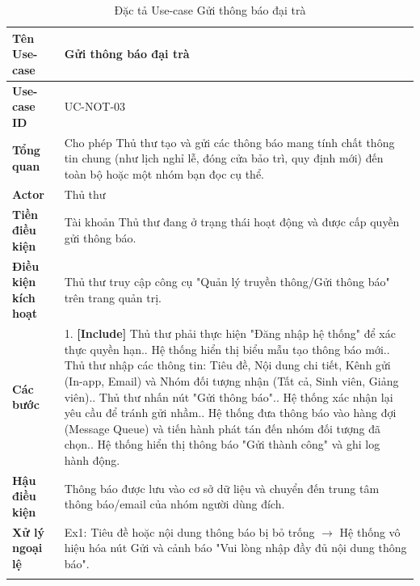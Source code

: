 \begin{longtable}{|p{3.5cm}|p{11.5cm}|}
    \hline
    \textbf{Tên Use-case} & \textbf{Gửi thông báo đại trà} \\
    \hline
    \textbf{Use-case ID} & UC-NOT-03 \\
    \hline
    \textbf{Tổng quan} & Cho phép Thủ thư tạo và gửi các thông báo mang tính chất thông tin chung (như lịch nghỉ lễ, đóng cửa bảo trì, quy định mới) đến toàn bộ hoặc một nhóm bạn đọc cụ thể. \\
    \hline
    \textbf{Actor} & Thủ thư \\
    \hline
    \textbf{Tiền điều kiện} & Tài khoản Thủ thư đang ở trạng thái hoạt động và được cấp quyền gửi thông báo. \\
    \hline
    \textbf{Điều kiện kích hoạt} & Thủ thư truy cập công cụ "Quản lý truyền thông/Gửi thông báo" trên trang quản trị. \\
    \hline
    \textbf{Các bước} & 
    1. \textbf{[Include]} Thủ thư phải thực hiện "Đăng nhập hệ thống" để xác thực quyền hạn.\newline
    2. Hệ thống hiển thị biểu mẫu tạo thông báo mới.\newline
    3. Thủ thư nhập các thông tin: Tiêu đề, Nội dung chi tiết, Kênh gửi (In-app, Email) và Nhóm đối tượng nhận (Tất cả, Sinh viên, Giảng viên).\newline
    4. Thủ thư nhấn nút "Gửi thông báo".\newline
    5. Hệ thống xác nhận lại yêu cầu để tránh gửi nhầm.\newline
    6. Hệ thống đưa thông báo vào hàng đợi (Message Queue) và tiến hành phát tán đến nhóm đối tượng đã chọn.\newline
    7. Hệ thống hiển thị thông báo "Gửi thành công" và ghi log hành động. \\
    \hline
    \textbf{Hậu điều kiện} & Thông báo được lưu vào cơ sở dữ liệu và chuyển đến trung tâm thông báo/email của nhóm người dùng đích. \\
    \hline
    \textbf{Xử lý ngoại lệ} & 
    Ex1: Tiêu đề hoặc nội dung thông báo bị bỏ trống $\rightarrow$ Hệ thống vô hiệu hóa nút Gửi và cảnh báo "Vui lòng nhập đầy đủ nội dung thông báo". \\
    \hline
    \caption{Đặc tả Use-case Gửi thông báo đại trà}
\end{longtable}


